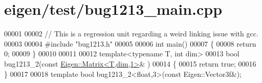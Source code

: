 \hypertarget{eigen_2test_2bug1213__main_8cpp_source}{}\section{eigen/test/bug1213\+\_\+main.cpp}
\label{eigen_2test_2bug1213__main_8cpp_source}

\begin{DoxyCode}
00001 
00002 \textcolor{comment}{// This is a regression unit regarding a weird linking issue with gcc.}
00003 
00004 \textcolor{preprocessor}{#include "bug1213.h"}
00005 
00006 \textcolor{keywordtype}{int} main()
00007 \{
00008   \textcolor{keywordflow}{return} 0;
00009 \}
00010 
00011 
00012 \textcolor{keyword}{template}<\textcolor{keyword}{typename} T, \textcolor{keywordtype}{int} dim>
00013 \textcolor{keywordtype}{bool} bug1213\_2(\textcolor{keyword}{const} \hyperlink{group___core___module_class_eigen_1_1_matrix}{Eigen::Matrix<T,dim,1>}& )
00014 \{
00015   \textcolor{keywordflow}{return} \textcolor{keyword}{true};
00016 \}
00017 
00018 \textcolor{keyword}{template} \textcolor{keywordtype}{bool} bug1213\_2<float,3>(\textcolor{keyword}{const} Eigen::Vector3f&);
\end{DoxyCode}
